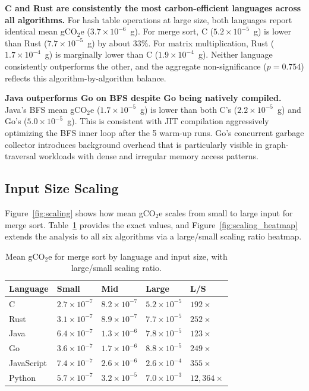 \textbf{C and Rust are consistently the most carbon-efficient languages across all algorithms.} For hash table operations at large size, both languages report identical mean gCO$_2$e ($3.7 \times 10^{-6}$~g). For merge sort, C ($5.2 \times 10^{-5}$~g) is lower than Rust ($7.7 \times 10^{-5}$~g) by about 33\%. For matrix multiplication, Rust ($1.7 \times 10^{-4}$~g) is marginally lower than C ($1.9 \times 10^{-4}$~g). Neither language consistently outperforms the other, and the aggregate non-significance ($p = 0.754$) reflects this algorithm-by-algorithm balance.

\textbf{Java outperforms Go on BFS despite Go being natively compiled.} Java's BFS mean gCO$_2$e ($1.7 \times 10^{-5}$~g) is lower than both C's ($2.2 \times 10^{-5}$~g) and Go's ($5.0 \times 10^{-5}$~g). This is consistent with JIT compilation aggressively optimizing the BFS inner loop after the 5 warm-up runs. Go's concurrent garbage collector introduces background overhead that is particularly visible in graph-traversal workloads with dense and irregular memory access patterns.




\subsection{Input Size Scaling}
 
Figure~\ref{fig:scaling} shows how mean gCO$_2$e scales from small to large input for merge sort. Table~\ref{tab:scaling} provides the exact values, and Figure~\ref{fig:scaling_heatmap} extends the analysis to all six algorithms via a large/small scaling ratio heatmap.
 
\begin{table}[h]
    \centering
    \caption{Mean gCO$_2$e for merge sort by language and input size, with large/small scaling ratio.}
    \label{tab:scaling}
    \small
    \begin{tabular}{lllll}
        \hline
        \textbf{Language} & \textbf{Small} & \textbf{Mid} & \textbf{Large} & \textbf{L/S} \\
        \hline
        C          & $2.7\times10^{-7}$ & $8.2\times10^{-7}$ & $5.2\times10^{-5}$ & $192\times$      \\
        Rust       & $3.1\times10^{-7}$ & $8.9\times10^{-7}$ & $7.7\times10^{-5}$ & $252\times$      \\
        Java       & $6.4\times10^{-7}$ & $1.3\times10^{-6}$ & $7.8\times10^{-5}$ & $123\times$      \\
        Go         & $3.6\times10^{-7}$ & $1.7\times10^{-6}$ & $8.8\times10^{-5}$ & $249\times$      \\
        JavaScript & $7.4\times10^{-7}$ & $2.6\times10^{-6}$ & $2.6\times10^{-4}$ & $355\times$      \\
        Python     & $5.7\times10^{-7}$ & $3.2\times10^{-5}$ & $7.0\times10^{-3}$ & $12{,}364\times$ \\
        \hline
    \end{tabular}
\end{table}
 
